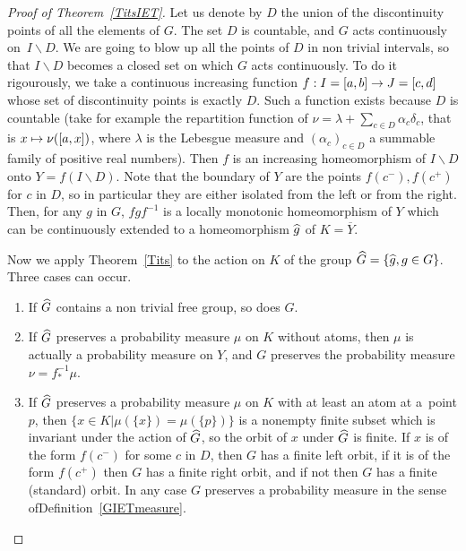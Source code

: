 \documentclass[10pt]{amsart}
\theoremstyle{definition}\newtheorem{defi}[theo]{Definition}\newtheorem{rema}[theo]{Remark}\newtheorem{exam}[theo]{Example}\newtheorem{exem}[theo]{Example}\newtheorem{nota}[theo]{Notation}
\newcounter{setofcase}
\newcounter{case}[setofcase]
\let\oldmapsto\mapsto
\renewcommand*{\mapsto}{\mathchoice{\longmapsto}{\oldmapsto}{\oldmapsto}{\oldmapsto}}
\renewcommand*{\to}{\mathchoice{\longrightarrow}{\rightarrow}{\rightarrow}{\rightarrow}}
\let\oldhat\hat
\renewcommand*{\hat}[1]{\mathchoice{\widehat{#1}}{\widehat{#1}}{\oldhat{#1}}{\oldhat{#1}}}
\begin{document}
\begin{proof}[Proof of Theorem~\ref{TitsIET}]
Let us denote by $D$ the union of the discontinuity points of all the elements of $G$. The set $D$ is countable, and $G$ acts continuously on~$I\backslash D$. We are going to blow up all the points of $D$ in non trivial intervals, so that $I\backslash D$ becomes a closed set on which $G$ acts continuously. To do it rigourously, we take a continuous increasing function $f:I=[a,b]\to J=[c,d]$ whose set of discontinuity points is exactly $D$. Such a function exists because $D$ is countable (take for example the repartition function of $\nu=\lambda+\sum_{c\in D} \alpha_c \delta_c$, that is $x \mapsto \nu([a,x])$, where $\lambda$ is the Lebesgue measure and $(\alpha_c)_{c\in D}$ a summable family of positive real numbers). Then $f$ is an increasing homeomorphism of $I\backslash D$ onto $Y=f(I\backslash D)$. Note that the boundary of $Y$ are the points $f(c^-),f(c^+)$ for $c$ in $D$, so in particular they are either isolated from the left or from the right. Then, for any $g$ in $G$, $fgf^{-1}$ is a locally monotonic homeomorphism of $Y$ which can be continuously extended to a homeomorphism $\hat{g}$ of $K=\overline{Y}$.

\pagebreak{}
Now we apply Theorem~\ref{Tits} to the action on $K$ of the group $\hat{G}=\{\hat{g},g\in G\}$. Three cases can occur.
\begin{enumerate}
\item If $\hat{G}$ contains a non trivial free group, so does $G$.
\item If $\hat{G}$ preserves a probability measure $\mu$ on $K$ without atoms, then $\mu$ is actually a probability measure on $Y$, and $G$ preserves the probability measure ${\nu=f^{-1}_*\mu}$.
\item If $\hat{G}$ preserves a probability measure $\mu$ on $K$ with at least an atom at a~point $p$, then $\{x\in K| \mu(\{x\})=\mu(\{p\})\}$ is a nonempty finite subset which is invariant under the action of $\hat{G}$, so the orbit of $x$ under $\hat{G}$ is finite. If $x$ is of the form $f(c^-)$ for some $c$ in $D$, then $G$ has a finite left orbit, if it is of the form $f(c^+)$ then $G$ has a finite right orbit, and if not then $G$ has a finite (standard) orbit. In any case $G$ preserves a probability measure in the sense of\linebreak Definition~\ref{GIETmeasure}.\qedhere
\end{enumerate}\let\qed\relax
\end{proof}
\end{document}

